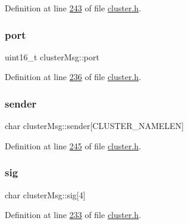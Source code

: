 Definition at line \hyperlink{cluster_8h_source_l00243}{243} of file \hyperlink{cluster_8h_source}{cluster.\+h}.

\mbox{\label{structclusterMsg_a610f1d78c588de5b3c3414f892e72974}} 
\subsubsection{\texorpdfstring{port}{port}}
{\footnotesize\ttfamily uint16\+\_\+t cluster\+Msg\+::port}



Definition at line \hyperlink{cluster_8h_source_l00236}{236} of file \hyperlink{cluster_8h_source}{cluster.\+h}.

\mbox{\label{structclusterMsg_acbf8f00d4c949073cb849d4f32ae6f53}} 
\subsubsection{\texorpdfstring{sender}{sender}}
{\footnotesize\ttfamily char cluster\+Msg\+::sender\mbox{[}C\+L\+U\+S\+T\+E\+R\+\_\+\+N\+A\+M\+E\+L\+EN\mbox{]}}



Definition at line \hyperlink{cluster_8h_source_l00245}{245} of file \hyperlink{cluster_8h_source}{cluster.\+h}.

\mbox{\label{structclusterMsg_abb326313abd3ddb06eac6b9fd4273e96}} 
\subsubsection{\texorpdfstring{sig}{sig}}
{\footnotesize\ttfamily char cluster\+Msg\+::sig\mbox{[}4\mbox{]}}



Definition at line \hyperlink{cluster_8h_source_l00233}{233} of file \hyperlink{cluster_8h_source}{cluster.\+h}.

\mbox{\label{structclusterMsg_a5ca36f3f6316a0dfbf9ad4a1bbfdeb4a}} 
